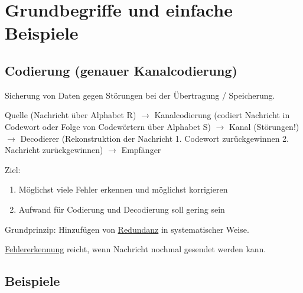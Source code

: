 \section{Grundbegriffe und einfache Beispiele}

  \subsection{Codierung (genauer Kanalcodierung)}

  Sicherung von Daten gegen Störungen bei der Übertragung / Speicherung.

  \par \medskip

  Quelle (Nachricht über Alphabet R) $\longrightarrow$ Kanalcodierung (codiert Nachricht in Codewort oder Folge von Codewörtern über Alphabet S) $\longrightarrow$ Kanal (Störungen!) $\longrightarrow$ Decodierer (Rekonstruktion der Nachricht 1. Codewort zurückgewinnen 2. Nachricht zurückgewinnen) $\longrightarrow$ Empfänger

  \par \medskip

  \par \medskip

  Ziel: 

  \begin{enumerate}
    \item Möglichst viele Fehler erkennen und möglichst korrigieren
    \item Aufwand für Codierung und Decodierung soll gering sein
  \end{enumerate}

  Grundprinzip: Hinzufügen von \underline{Redundanz} in systematischer Weise.

  \par \medskip

  \underline{Fehlererkennung} reicht, wenn Nachricht nochmal gesendet werden kann.

  \subsection{Beispiele}

